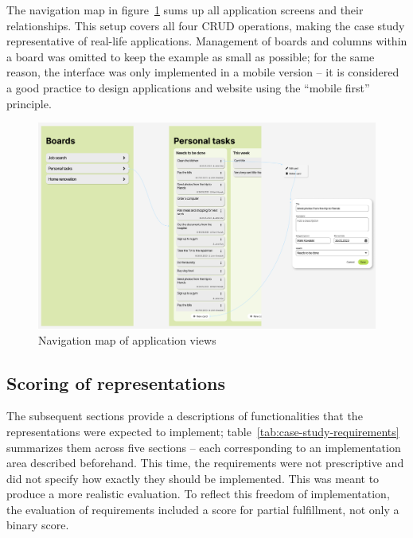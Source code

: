 The navigation map in figure~\ref{fig:3-4-navigation-map} sums up all application screens and their relationships.
This setup covers all four CRUD operations, making the case study representative of real-life applications.
Management of boards and columns within a board was omitted to keep the example as small as possible;
for the same reason, the interface was only implemented in a mobile version -- it is considered a good practice to design applications and website using the \enquote{mobile first} principle.

\begin{figure}
    \centering
    \includegraphics[width=\textwidth]{3-research-methodology/nav-map}
    \caption{Navigation map of application views}
    \label{fig:3-4-navigation-map}
\end{figure}

\subsection{Scoring of representations}\label{subsec:scoring-of-representations2}

The subsequent sections provide a descriptions of functionalities that the representations were expected to implement;
table~\ref{tab:case-study-requirements} summarizes them across five sections -- each corresponding to an implementation area described beforehand.
This time, the requirements were not prescriptive and did not specify how exactly they should be implemented.
This was meant to produce a more realistic evaluation.
To reflect this freedom of implementation, the evaluation of requirements included a score for partial fulfillment, not only a binary score.

